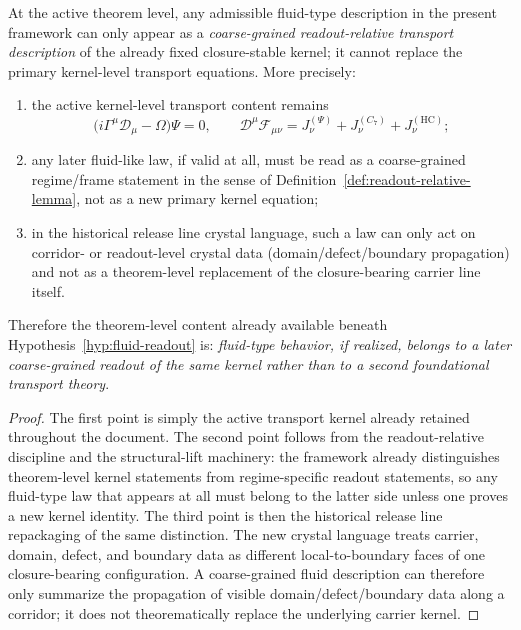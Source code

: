 \begin{theorem}
\label{thm:theorem-level-shadow-fluid-type-readout}
At the active theorem level, any admissible fluid-type description in the present framework can only appear as a \emph{coarse-grained readout-relative transport description} of the already fixed closure-stable kernel; it cannot replace the primary kernel-level transport equations. More precisely:
\begin{enumerate}[leftmargin=2em,label=(\roman*)]
 \item the active kernel-level transport content remains
 \[
 \bigl(i\Gamma^\mu\mathcal{D}_\mu - \Omega\bigr)\Psi = 0,
 \qquad
 \mathcal{D}^\mu\mathcal{F}_{\mu\nu}
 = J^{(\Psi)}_\nu + J^{(C_7)}_\nu + J^{(\mathrm{HC})}_\nu;
 \]
 \item any later fluid-like law, if valid at all, must be read as a coarse-grained regime/frame statement in the sense of Definition~\ref{def:readout-relative-lemma}, not as a new primary kernel equation;
 \item in the historical release line crystal language, such a law can only act on corridor- or readout-level crystal data (domain/defect/boundary propagation) and not as a theorem-level replacement of the closure-bearing carrier line itself.
\end{enumerate}
Therefore the theorem-level content already available beneath Hypothesis~\ref{hyp:fluid-readout} is: \emph{fluid-type behavior, if realized, belongs to a later coarse-grained readout of the same kernel rather than to a second foundational transport theory}.
\end{theorem}

\begin{proof}
The first point is simply the active transport kernel already retained throughout the document. The second point follows from the readout-relative discipline and the structural-lift machinery: the framework already distinguishes theorem-level kernel statements from regime-specific readout statements, so any fluid-type law that appears at all must belong to the latter side unless one proves a new kernel identity. The third point is then the historical release line repackaging of the same distinction. The new crystal language treats carrier, domain, defect, and boundary data as different local-to-boundary faces of one closure-bearing configuration. A coarse-grained fluid description can therefore only summarize the propagation of visible domain/defect/boundary data along a corridor; it does not theorematically replace the underlying carrier kernel.
\end{proof}

